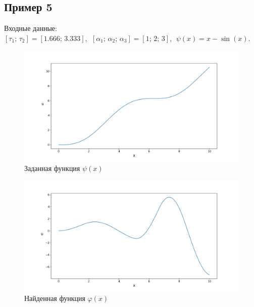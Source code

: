 \documentclass{article}
\theoremstyle{definition}
\begin{document}
\subsection{Пример 5}
Входные данные: \\
$[\tau_1;\, \tau_2] = [1.666;\, 3.333]$, $\;[\alpha_1;\, \alpha_2;\, \alpha_3] = [1;\, 2;\, 3]$, 
$\;\psi(x) = x - \sin(x)$.
\begin{figure}[H]
	\centering
	\includegraphics[trim={2.475cm, 0, 0, 1.5cm}, clip, scale=0.624]{410_psi.png}
	\caption{Заданная функция $\psi(x)$}
	\label{fig:image90}
\end{figure}

\begin{figure}[H]
	\centering
	\includegraphics[trim={2.3cm, 0, 0, 1.5cm}, clip, scale=0.62]{10_u0.png}
	\caption{Найденная функция $\varphi(x)$}
	\label{fig:image130}
\end{figure}

\newpage
\end{document}

